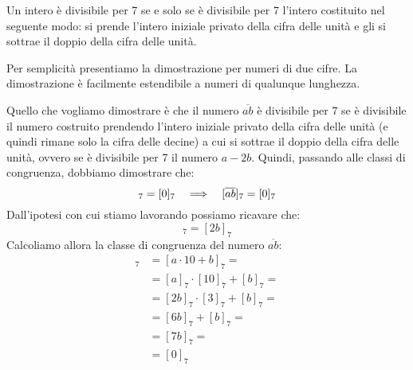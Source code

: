 \begin{teorema}
    Un intero è divisibile per 7 se e solo se è divisibile per 7 l'intero costituito nel seguente modo: si prende l'intero iniziale privato della cifra delle unità e gli si sottrae il doppio della cifra delle unità.

    Per semplicità presentiamo la dimostrazione per numeri di due cifre.
    La dimostrazione è facilmente estendibile a numeri di qualunque lunghezza.

    Quello che vogliamo dimostrare è che il numero $\overline{ab}$ è divisibile per 7 se è divisibile il numero costruito prendendo l'intero iniziale privato della cifra delle unità (e quindi rimane solo la cifra delle decine) a cui si sottrae il doppio della cifra delle unità, ovvero se è divisibile per 7 il numero $a - 2b$.
    Quindi, passando alle classi di congruenza, dobbiamo dimostrare che:
    \begin{equation*}
        [a - 2b]_7 = [0]_7 \allora [\overline{ab}]_7 = [0]_7
    \end{equation*}
    Dall'ipotesi con cui stiamo lavorando possiamo ricavare che:
    \begin{equation*}
        [a]_7 = [2b]_7
    \end{equation*}
    Calcoliamo allora la classe di congruenza del numero $\overline{ab}$:
    \begin{align*}
        [\overline{ab}]_7 &= [a \cdot 10 + b]_7 = \\
        &= [a]_7 \cdot [10]_7 + [b]_7 =\\
        &= [2b]_7 \cdot [3]_7 + [b]_7 =\\
        &= [6b]_7 + [b]_7 =\\
        &= [7b]_7 =\\
        &= [0]_7
    \end{align*}

\end{teorema}



